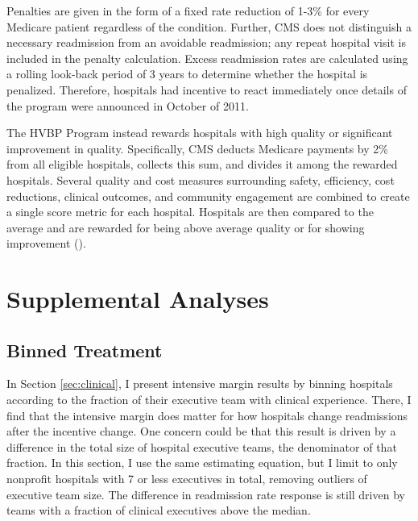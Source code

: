 \documentclass[12pt]{article}
\begin{document}
    Penalties are given in the form of a fixed rate reduction of 1-3\% for every Medicare patient regardless of the condition. Further, CMS does not distinguish a necessary readmission from an avoidable readmission; any repeat hospital visit is included in the penalty calculation. Excess readmission rates are calculated using a rolling look-back period of 3 years to determine whether the hospital is penalized. Therefore, hospitals had incentive to react immediately once details of the program were announced in October of 2011. 

    The HVBP Program instead rewards hospitals with high quality or significant improvement in quality. Specifically, CMS deducts Medicare payments by 2\% from all eligible hospitals, collects this sum, and divides it among the rewarded hospitals. Several quality and cost measures surrounding safety, efficiency, cost reductions, clinical outcomes, and community engagement are combined to create a single score metric for each hospital. Hospitals are then compared to the average and are rewarded for being above average quality or for showing improvement (\cite{CMS_2023}). 

    \section{Supplemental Analyses}

    \subsection{Binned Treatment}\label{app:binned}

    In Section \ref{sec:clinical}, I present intensive margin results by binning hospitals according to the fraction of their executive team with clinical experience. There, I find that the intensive margin does matter for how hospitals change readmissions after the incentive change. One concern could be that this result is driven by a difference in the total size of hospital executive teams, the denominator of that fraction. In this section, I use the same estimating equation, but I limit to only nonprofit hospitals with 7 or less executives in total, removing outliers of executive team size. The difference in readmission rate response is still driven by teams with a fraction of clinical executives above the median. 
\end{document}
